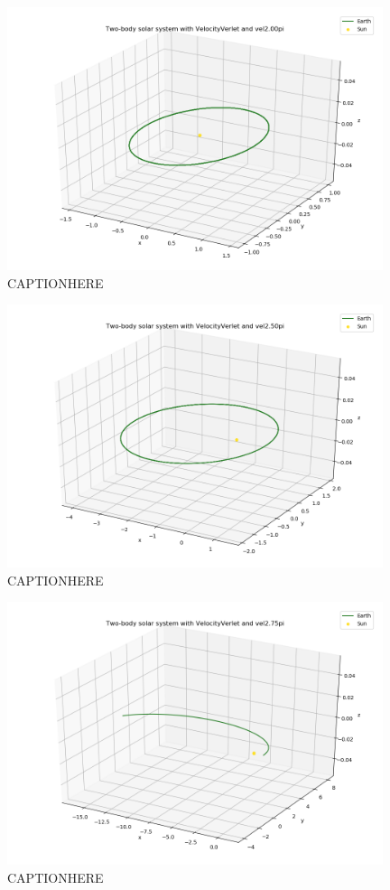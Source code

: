 \documentclass{article}
\begin{document}
    \begin{figure}[H]
        \centering
        \includegraphics[width = 11cm]{img/plot3D_S_E_V_vel200pi.png}
        \caption{CAPTIONHERE}
        \label{fig:plot3D_S_E_V_vel200pi}
    \end{figure}

    \begin{figure}[H]
        \centering
        \includegraphics[width = 11cm]{img/plot3D_S_E_V_vel250pi.png}
        \caption{CAPTIONHERE}
        \label{fig:plot3D_S_E_V_vel250pi}
    \end{figure}

    \begin{figure}[H]
        \centering
        \includegraphics[width = 11cm]{img/plot3D_S_E_V_vel275pi.png}
        \caption{CAPTIONHERE}
        \label{fig:plot3D_S_E_V_vel275pi}
    \end{figure}
\end{document}
